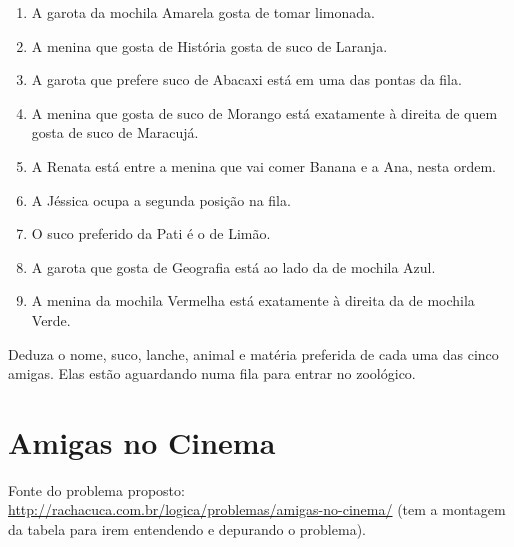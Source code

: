\documentclass[a4paper,12pt]{article}
\begin{document}
{{\begin{enumerate}
\item	A garota da mochila Amarela gosta de tomar limonada.
\item	A menina que gosta de História gosta de suco de Laranja.
\item	A garota que prefere suco de Abacaxi está em uma das pontas da fila.
\item	A menina que gosta de suco de Morango está exatamente à direita de quem gosta de suco de Maracujá.
\item	A Renata está entre a menina que vai comer Banana e a Ana, nesta ordem.
\item	A Jéssica ocupa a segunda posição na fila.
\item	O suco preferido da Pati é o de Limão.
\item	A garota que gosta de Geografia está ao lado da de mochila Azul.
\item	A menina da mochila Vermelha está exatamente à direita da de mochila Verde.
   
\end{enumerate}

Deduza o nome, suco, lanche, animal e matéria preferida de cada uma das cinco amigas. Elas estão aguardando numa fila para entrar no zoológico.



\newpage
\section{Amigas no Cinema}

 Fonte do problema proposto:\\
 \url{http://rachacuca.com.br/logica/problemas/amigas-no-cinema/}
 (tem a montagem da tabela para irem entendendo e depurando o problema).\\

}}
\end{document}
